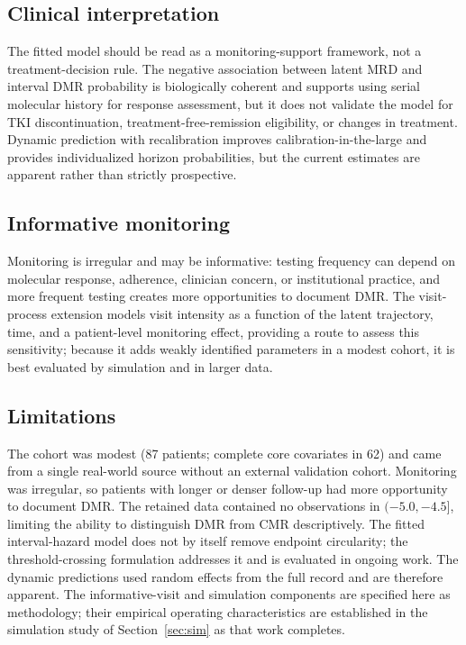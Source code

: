 \documentclass[11pt]{article}
\begin{document}
\subsection{Clinical interpretation}

The fitted model should be read as a monitoring-support framework, not a
treatment-decision rule. The negative association between latent MRD and
interval DMR probability is biologically coherent and supports using
serial molecular history for response assessment, but it does not validate
the model for TKI discontinuation, treatment-free-remission eligibility,
or changes in treatment. Dynamic prediction with recalibration improves
calibration-in-the-large and provides individualized horizon
probabilities, but the current estimates are apparent rather than strictly
prospective.

\subsection{Informative monitoring}

Monitoring is irregular and may be informative: testing frequency can
depend on molecular response, adherence, clinician concern, or
institutional practice, and more frequent testing creates more
opportunities to document DMR. The visit-process extension models visit
intensity as a function of the latent trajectory, time, and a
patient-level monitoring effect, providing a route to assess this
sensitivity; because it adds weakly identified parameters in a modest
cohort, it is best evaluated by simulation and in larger data.

\subsection{Limitations}

The cohort was modest (87 patients; complete core covariates in 62) and
came from a single real-world source without an external validation
cohort. Monitoring was irregular, so patients with longer or denser
follow-up had more opportunity to document DMR. The retained data
contained no observations in $(-5.0,-4.5]$, limiting the ability to
distinguish DMR from CMR descriptively. The fitted interval-hazard model
does not by itself remove endpoint circularity; the threshold-crossing
formulation addresses it and is evaluated in ongoing work. The dynamic
predictions used random effects from the full record and are therefore
apparent. The informative-visit and simulation components are specified
here as methodology; their empirical operating characteristics are
established in the simulation study of Section~\ref{sec:sim} as that work
completes.
\end{document}
